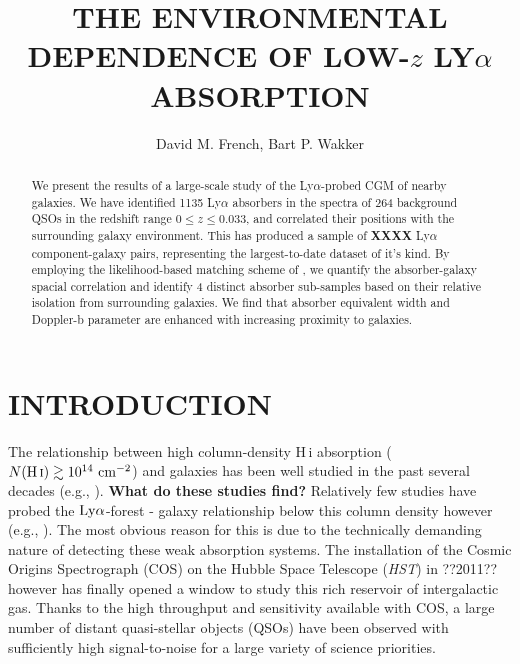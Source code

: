 \documentclass[twocolumn,tighten]{aastex62}
\newcommand{\HI}{\mbox{H\,{\sc i}} }
\begin{document}
\title{THE ENVIRONMENTAL DEPENDENCE OF LOW-$z$ LY$\alpha$ ABSORPTION}



\author{David M. French, Bart P. Wakker}


\begin{abstract}
We present the results of a large-scale study of the Ly$\alpha$-probed CGM of nearby galaxies. We have identified 1135 Ly$\alpha$ absorbers in the spectra of 264 background QSOs in the redshift range $0 \leq z \leq 0.033$, and correlated their positions with the surrounding galaxy environment. This has produced a sample of \textbf{XXXX} Ly$\alpha$ component-galaxy pairs, representing the largest-to-date dataset of it's kind. By employing the likelihood-based matching scheme of \cite{french2017}, we quantify the absorber-galaxy spacial correlation and identify 4 distinct absorber sub-samples based on their relative isolation from surrounding galaxies. We find that absorber equivalent width and Doppler-b parameter are enhanced with increasing proximity to galaxies.

\end{abstract}




\section{INTRODUCTION}

The relationship between high column-density \HI absorption ($N(\HI) \gtrsim 10^{14} ~\rm cm^{-2}$) and galaxies has been well studied in the past several decades (e.g., \citealt{lanzetta1995, bowen1998, bowen2002, chen2003, chen2008, steidel2010, prochaska2011b}). \textbf{What do these studies find?} Relatively few studies have probed the $\rm Ly\alpha$-forest - galaxy relationship below this column density however (e.g., \citealt{wakker2009, french2017, bowen2002}). The most obvious reason for this is due to the technically demanding nature of detecting these weak absorption systems. The installation of the Cosmic Origins Spectrograph (COS) on the Hubble Space Telescope (\emph{HST}) in ??2011?? however has finally opened a window to study this rich reservoir of intergalactic gas.  Thanks to the high throughput and sensitivity available with COS, a large number of distant quasi-stellar objects (QSOs) have been observed with sufficiently high signal-to-noise for a large variety of science priorities. 
\end{document}
